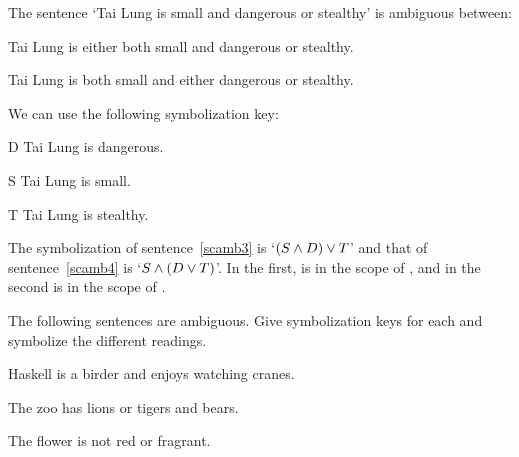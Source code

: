 The sentence `Tai Lung is small and dangerous or stealthy' is ambiguous between:
\begin{earg}
	\item[\ex{scamb3}] Tai Lung is either both small and dangerous or stealthy.
	\item[\ex{scamb4}] Tai Lung is both small and either dangerous or stealthy.
\end{earg}
We can use the following symbolization key:
\begin{ekey}
	\item[D] Tai Lung is dangerous.
	\item[S] Tai Lung is small.
	\item[T] Tai Lung is stealthy.
\end{ekey}
The symbolization of sentence~\ref{scamb3} is `$(S \mathbin{\wedge} D) \vee T$' and that of sentence~\ref{scamb4} is `$S \mathbin{\wedge} (D \vee T)$'. In the first, \eand is in the scope of \eor, and in the second \eor is in the scope of \eand.

\begin{practiceproblems}
\solutions
\problempart The following sentences are ambiguous. Give symbolization keys for each and symbolize the different readings.
\begin{earg}
	\item Haskell is a birder and enjoys watching cranes.
	\item The zoo has lions or tigers and bears.
	\item The flower is not red or fragrant.
\end{earg}
\end{practiceproblems}



